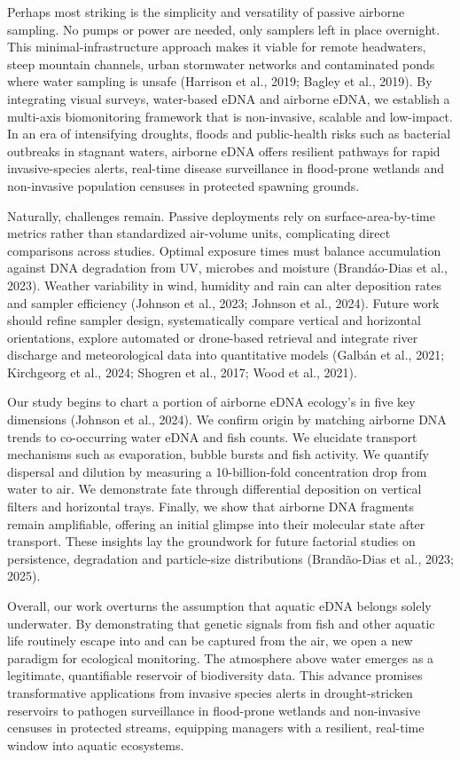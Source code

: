 \documentclass{article}
\begin{document}
Perhaps most striking is the simplicity and versatility of passive airborne sampling. No pumps or power are needed, only samplers left in place overnight. This minimal-infrastructure approach makes it viable for remote headwaters, steep mountain channels, urban stormwater networks and contaminated ponds where water sampling is unsafe (Harrison et al., 2019; Bagley et al., 2019). By integrating visual surveys, water-based eDNA and airborne eDNA, we establish a multi-axis biomonitoring framework that is non-invasive, scalable and low-impact. In an era of intensifying droughts, floods and public-health risks such as bacterial outbreaks in stagnant waters, airborne eDNA offers resilient pathways for rapid invasive-species alerts, real-time disease surveillance in flood-prone wetlands and non-invasive population censuses in protected spawning grounds.

Naturally, challenges remain. Passive deployments rely on surface-area-by-time metrics rather than standardized air-volume units, complicating direct comparisons across studies. Optimal exposure times must balance accumulation against DNA degradation from UV, microbes and moisture (Brandáo-Dias et al., 2023). Weather variability in wind, humidity and rain can alter deposition rates and sampler efficiency (Johnson et al., 2023; Johnson et al., 2024). Future work should refine sampler design, systematically compare vertical and horizontal orientations, explore automated or drone-based retrieval and integrate river discharge and meteorological data into quantitative models (Galbán et al., 2021; Kirchgeorg et al., 2024; Shogren et al., 2017; Wood et al., 2021).

Our study begins to chart a portion of airborne eDNA ecology's in five key dimensions (Johnson et al., 2024). We confirm origin by matching airborne DNA trends to co-occurring water eDNA and fish counts. We elucidate transport mechanisms such as evaporation, bubble bursts and fish activity. We quantify dispersal and dilution by measuring a 10-billion-fold concentration drop from water to air. We demonstrate fate through differential deposition on vertical filters and horizontal trays. Finally, we show that airborne DNA fragments remain amplifiable, offering an initial glimpse into their molecular state after transport. These insights lay the groundwork for future factorial studies on persistence, degradation and particle-size distributions (Brandão-Dias et al., 2023; 2025).

Overall, our work overturns the assumption that aquatic eDNA belongs solely underwater. By demonstrating that genetic signals from fish and other aquatic life routinely escape into and can be captured from the air, we open a new paradigm for ecological monitoring. The atmosphere above water emerges as a legitimate, quantifiable reservoir of biodiversity data. This advance promises transformative applications from invasive species alerts in drought-stricken reservoirs to pathogen surveillance in flood-prone wetlands and non-invasive censuses in protected streams, equipping managers with a resilient, real-time window into aquatic ecosystems.
\end{document}
